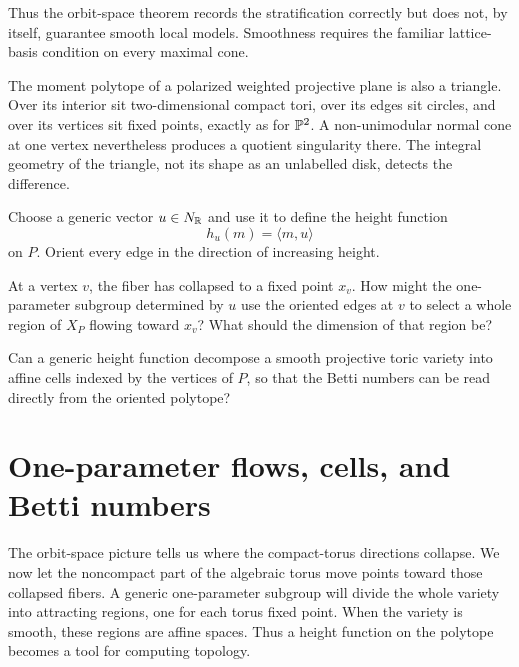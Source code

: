 Thus the orbit-space theorem records the stratification correctly but
does not, by itself, guarantee smooth local models. Smoothness requires
the familiar lattice-basis condition on every maximal cone.

\begin{observation}
The moment polytope of a polarized weighted projective plane is also a
triangle. Over its interior sit two-dimensional compact tori, over its
edges sit circles, and over its vertices sit fixed points, exactly as
for \(\mathbb{P}^2\). A non-unimodular normal cone at one vertex nevertheless
produces a quotient singularity there. The integral geometry of the
triangle, not its shape as an unlabelled disk, detects the difference.
\end{observation}

\begin{prediction}
Choose a generic vector \(u\in N_{\mathbb{R}}\) and use it to define the height
function
\[
h_u(m)=\langle m,u\rangle
\]
on \(P\). Orient every edge in the direction of increasing height.

At a vertex \(v\), the fiber has collapsed to a fixed point \(x_v\).
How might the one-parameter subgroup determined by \(u\) use the
oriented edges at \(v\) to select a whole region of \(X_P\) flowing
toward \(x_v\)? What should the dimension of that region be?
\end{prediction}

\begin{guidingquestion}
Can a generic height function decompose a smooth projective toric
variety into affine cells indexed by the vertices of \(P\), so that
the Betti numbers can be read directly from the oriented polytope?
\end{guidingquestion}

\section{One-parameter flows, cells, and Betti numbers}
\label{sec:one-parameter-flows-cells-betti}

The orbit-space picture tells us where the compact-torus directions
collapse. We now let the noncompact part of the algebraic torus move
points toward those collapsed fibers. A generic one-parameter subgroup
will divide the whole variety into attracting regions, one for each
torus fixed point. When the variety is smooth, these regions are affine
spaces. Thus a height function on the polytope becomes a tool for
computing topology.

